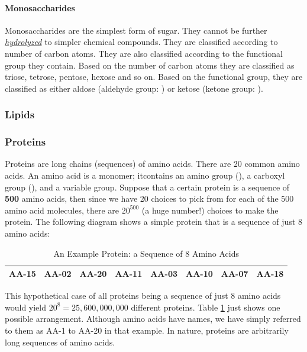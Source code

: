 \documentclass[12pt]{article}
\begin{document}
\paragraph{Monosaccharides}
Monosaccharides are the simplest form of sugar. They cannot be further \hyperref[sec: hydrolysis]{\emph{hydrolyzed}} to simpler chemical compounds. They are classified according to number of carbon atoms. They are also classified according to the functional group they contain. Based on the number of carbon atoms they are classified as triose, tetrose, pentose, hexose and so on. Based on the functional group, they are classified as either aldose (aldehyde group: ) or ketose (ketone group: ).
\subsubsection{Lipids}
\subsubsection{Proteins}
Proteins are long chains (sequences) of amino acids. There are 20 common amino acids. An amino acid is a monomer; itcontains an amino group (), a carboxyl group (), and a variable group. Suppose that a certain protein is a sequence of \textbf{500} amino acids, then since we have 20 choices to pick from for each of the 500 amino acid molecules, there are $20^{500}$ (a huge number!) choices to make the protein. The following diagram shows a simple protein that is a sequence of just 8 amino acids: 
\begin{table}[htbp!]
  \begin{center}
    \caption{An Example Protein: a Sequence of 8 Amino Acids}
    \label{tab: simple protein}
    \begin{tabular}{|c|c|c|c|c|c|c|c|} 
      \hline
        AA-15 &
        AA-02 &
        AA-20 &
        AA-11 &
        AA-03 &
        AA-10 &
        AA-07 &
        AA-18 \\
        \hline
    \end{tabular}
  \end{center}
\end{table}
This hypothetical case of all proteins being a sequence of just 8 amino acids would yield 
$20^8=25,600,000,000$ different proteins. Table \ref{tab: simple protein} just shows one possible arrangement. Although amino acids have names, we have simply referred to them as AA-1 to AA-20 in that example. In nature, proteins are arbitrarily long sequences of amino acids.
\end{document}
